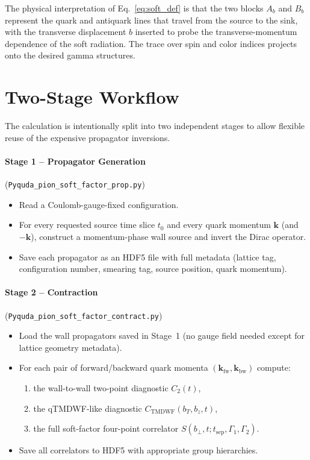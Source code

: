 \documentclass[11pt,a4paper]{article}
\newcommand{\walltag}[1]{\texttt{#1}}
\begin{document}
The physical interpretation of Eq.~\eqref{eq:soft_def} is that the two blocks
$A_{b}$ and $B_{b}$ represent the quark and antiquark lines that travel from the
source to the sink, with the transverse displacement $b$ inserted to probe the
transverse-momentum dependence of the soft radiation.  The trace over spin and
color indices projects onto the desired gamma structures.

\section{Two-Stage Workflow}

The calculation is intentionally split into two independent stages to allow flexible
reuse of the expensive propagator inversions.

\paragraph{Stage 1 -- Propagator Generation}
(\walltag{Pyquda\_pion\_soft\_factor\_prop.py})

\begin{itemize}[nosep]
  \item Read a Coulomb-gauge-fixed configuration.
  \item For every requested source time slice $t_{0}$ and every quark momentum
        $\mathbf{k}$ (and $-\mathbf{k}$), construct a momentum-phase wall source and
        invert the Dirac operator.
  \item Save each propagator as an HDF5 file with full metadata (lattice tag,
        configuration number, smearing tag, source position, quark momentum).
\end{itemize}

\paragraph{Stage 2 -- Contraction}
(\walltag{Pyquda\_pion\_soft\_factor\_contract.py})

\begin{itemize}[nosep]
  \item Load the wall propagators saved in Stage~1 (no gauge field needed except for
        lattice geometry metadata).
  \item For each pair of forward/backward quark momenta $(\mathbf{k}_{\mathrm{fw}},
        \mathbf{k}_{\mathrm{bw}})$ compute:
        \begin{enumerate}[nosep,label=(\roman*)]
          \item the wall-to-wall two-point diagnostic $C_{2}(t)$,
          \item the qTMDWF-like diagnostic $C_{\mathrm{TMDWF}}(b_{T}, b_{z}, t)$,
          \item the full soft-factor four-point correlator
                $S(b_{\perp}, t; t_{\mathrm{sep}}, \Gamma_{1}, \Gamma_{2})$.
        \end{enumerate}
  \item Save all correlators to HDF5 with appropriate group hierarchies.
\end{itemize}
\end{document}
